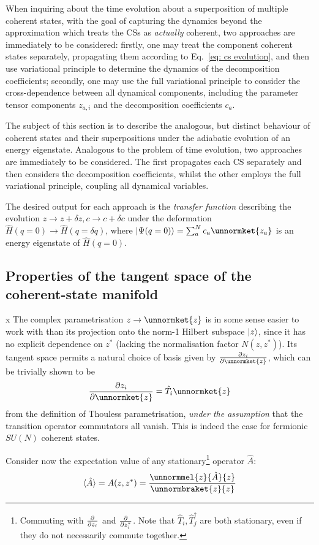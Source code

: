 \documentclass[12pt]{article}
\newcommand{\seq}[1]{\langle #1\rangle}
\newcommand{\hc}{^\dagger}
\begin{document}
	When inquiring about the time evolution about a superposition of multiple coherent states, with the goal of capturing the dynamics beyond the approximation which treats the CSs as \textit{actually} coherent, two approaches are immediately to be considered: firstly, one may treat the component coherent states separately, propagating them according to Eq.~\eqref{eq: cs evolution}, and then use variational principle to determine the dynamics of the decomposition coefficients; secondly, one may use the full variational principle to consider the cross-dependence between all dynamical components, including the parameter tensor components $z_{a,i}$ and the decomposition coefficients $c_a$.
	
	The subject of this section is to describe the analogous, but distinct behaviour of coherent states and their superpositions under the adiabatic evolution of an energy eigenstate. Analogous to the problem of time evolution, two approaches are immediately to be considered. The first propagates each CS separately and then considers the decomposition coefficients, whilst the other employs the full variational principle, coupling all dynamical variables.
	
	The desired output for each approach is the \textit{transfer function} describing the evolution $z\to z + \delta z, c \to c + \delta c$ under the deformation $\hat{H}(q = 0) \to \hat{H}(q = \delta q)$, where $\ket{\Psi (q = 0)} = \sum_a^N c_a \unnormket{z_a}$ is an energy eigenstate of $\hat{H}(q = 0)$.
	
	\subsection{Properties of the tangent space of the coherent-state manifold}
	x
	The complex parametrisation $z \to \unnormket{z}$ is in some sense easier to work with than its projection onto the norm-1 Hilbert subspace $\ket{z}$, since it has no explicit dependence on $z^*$ (lacking the normalisation factor $N(z, z^*)$). Its tangent space permits a natural choice of basis given by $\pdv{z_i}\unnormket{z}$, which can be trivially shown to be
	\begin{equation}
	\pdv{z_i}\unnormket{z} = \hat{T}_i \unnormket{z}
	\end{equation}
	from the definition of Thouless parametrisation, \textit{under the assumption} that the transition operator commutators all vanish. This is indeed the case for fermionic $SU(N)$ coherent states.
	
	Consider now the expectation value of any stationary\footnote{Commuting with $\pdv{z_i}$ and $\pdv{z_i^*}$. Note that $\hat{T}_i, \hat{T}_j\hc$ are both stationary, even if they do not necessarily commute together.} operator $\hat{A}$:
	\begin{equation}
	\seq{\hat{A}} = A(z, z^*) = \frac{\unnormmel{z}{\hat{A}}{z}}{\unnormbraket{z}{z}}
	\end{equation}
	
\end{document}
